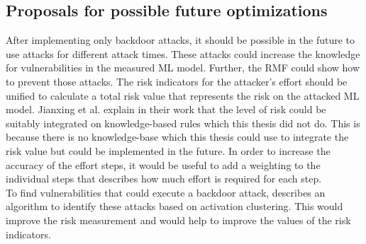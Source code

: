 \subsection{Proposals for possible future optimizations}

After implementing only backdoor attacks, it should be possible in the future to use attacks for different attack times. These attacks could increase the knowledge for vulnerabilities in the measured ML model. Further, the RMF could show how to prevent those attacks. The risk indicators for the attacker's effort should be unified to calculate a total risk value that represents the risk on the attacked ML model. Jianxing et al. \cite{DBLP:journals/access/JianxingHSH21} explain in their work that the level of risk could be suitably integrated on knowledge-based rules which this thesis did not do. This is because there is no knowledge-base which this thesis could use to integrate the risk value but could be implemented in the future. In order to increase the accuracy of the effort steps, it would be useful to add a weighting to the individual steps that describes how much effort is required for each step. \\
To find vulnerabilities that could execute a backdoor attack, \cite{DBLP:journals/corr/abs-1811-03728} describes an algorithm to identify these attacks based on activation clustering. This would improve the risk measurement and would help to improve the values of the risk indicators.
